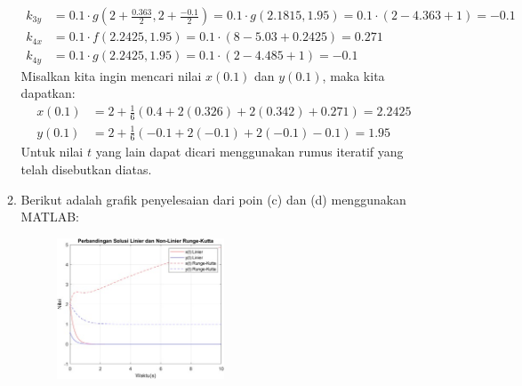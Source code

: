 \documentclass{article}
\begin{document}
\begin{enumerate}
\begin{enumerate}[label=\alph*.]
\begin{align*}
                k_{3y} &= 0.1 \cdot g\left(2 + \frac{0.363}{2}, 2 + \frac{-0.1}{2}\right) = 0.1 \cdot g(2.1815,1.95) = 0.1 \cdot (2-4.363+1) = -0.1\\
                k_{4x} &= 0.1 \cdot f(2.2425,1.95) = 0.1 \cdot (8-5.03+0.2425) = 0.271\\
                k_{4y} &= 0.1 \cdot g(2.2425,1.95) = 0.1 \cdot (2-4.485+1) = -0.1
            \end{align*}
            Misalkan kita ingin mencari nilai $x(0.1)$ dan $y(0.1)$, maka kita dapatkan:
            \begin{align*}
                x(0.1) &= 2 + \frac{1}{6}(0.4 + 2(0.326) + 2(0.342) + 0.271) = 2.2425\\
                y(0.1) &= 2 + \frac{1}{6}(-0.1 + 2(-0.1) + 2(-0.1) - 0.1) = 1.95
            \end{align*}
            Untuk nilai $t$ yang lain dapat dicari menggunakan rumus iteratif yang telah disebutkan diatas.
            \item Berikut adalah grafik penyelesaian dari poin (c) dan (d) menggunakan MATLAB:
            \begin{figure}[h!]
                \centering
                \includegraphics[width=0.5\textwidth]{2cd.jpg}
            \end{figure}
        \end{enumerate}
    \end{enumerate}
        
\end{document}
